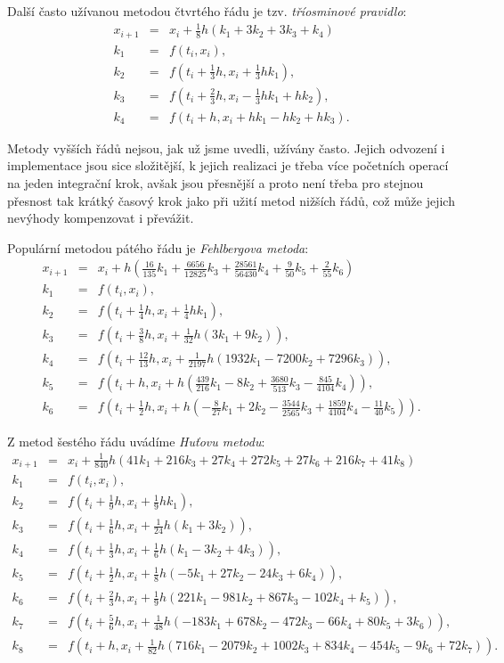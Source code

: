 \documentclass[a4paper, 12pt]{book}
\theoremstyle{definition}
\begin{document}
Další často užívanou metodou čtvrtého řádu je tzv. {\em tříosminové pravidlo}:
\begin{eqnarray*}
x_{i+1} &=& x_i+ \frac 18 h (k_1+3k_2+3k_3+k_4)\\
k_1 &=& f(t_i,x_i),\\
k_2 &=& f(t_i+\frac 13 h,x_i+\frac 13 hk_1),\\
k_3 &=& f(t_i+\frac 23 h,x_i-\frac 13 hk_1+hk_2),\\
k_4 &=& f(t_i+h,x_i+hk_1-hk_2+hk_3).
\end{eqnarray*}

Metody vyšších řádů nejsou, jak už jsme uvedli, užívány často. Jejich odvození 
i implementace jsou sice složitější, k jejich realizaci je třeba více početních 
operací na jeden integrační krok, avšak jsou přesnější a proto není třeba pro 
stejnou přesnost tak krátký časový krok jako při užití metod nižších řádů, což
může jejich nevýhody kompenzovat i převážit.

Populární metodou pátého řádu je {\em Fehlbergova metoda}:
\begin{eqnarray*}
x_{i+1} &=& x_i+ h\left(\frac {16}{135} k_1+\frac {6656}{12825} k_3+\frac {28561}{56430} k_4+\frac 9{50} k_5+\frac 2{55} k_6\right)\\
k_1 &=& f(t_i,x_i),\\
k_2 &=& f(t_i+\frac 14 h,x_i+\frac 14 hk_1),\\
k_3 &=& f(t_i+\frac 38 h,x_i+\frac 1{32} h(3k_1+9k_2)),\\
k_4 &=& f(t_i+\frac {12}{13}h,x_i+\frac 1{2197}h(1932k_1-7200k_2+7296k_3)),\\
k_5 &=& f(t_i+h,x_i+h(\frac{439}{216}k_1-8k_2+\frac{3680}{513}k_3-\frac{845}{4104}k_4)),\\
k_6 &=& f(t_i+\frac 12 h,x_i+h(-\frac 8{27}k_1+2k_2-\frac{3544}{2565}k_3+\frac{1859}{4104}k_4-\frac{11}{40}k_5)).
\end{eqnarray*}

Z metod šestého řádu uvádíme {\em Huťovu metodu}:
\begin{eqnarray*}
x_{i+1} &=& x_i+ \frac 1{840}h\left(41k_1+216k_3+27k_4+272k_5+27k_6+216k_7+41k_8\right)\\
k_1 &=& f(t_i,x_i),\\
k_2 &=& f(t_i+\frac 19 h,x_i+\frac 19 hk_1),\\
k_3 &=& f(t_i+\frac 16 h,x_i+\frac 1{24} h(k_1+3k_2)),\\
k_4 &=& f(t_i+\frac 13 h,x_i+\frac 16 h(k_1-3k_2+4k_3)),\\
k_5 &=& f(t_i+\frac 12 h,x_i+\frac 18 h(-5k_1+27k_2-24k_3+6k_4)),\\
k_6 &=& f(t_i+\frac 23 h,x_i+\frac 19 h(221k_1-981k_2+867k_3-102k_4+k_5)),\\
k_7 &=& f(t_i+\frac 56 h,x_i+\frac 1{48} h(-183k_1+678k_2-472k_3-66k_4+80k_5+3k_6)),\\
k_8 &=& f(t_i+h,x_i+\frac 1{82}h(716k_1-2079k_2+1002k_3+834k_4-454k_5-9k_6+72k_7)).
\end{eqnarray*}
\end{document}
